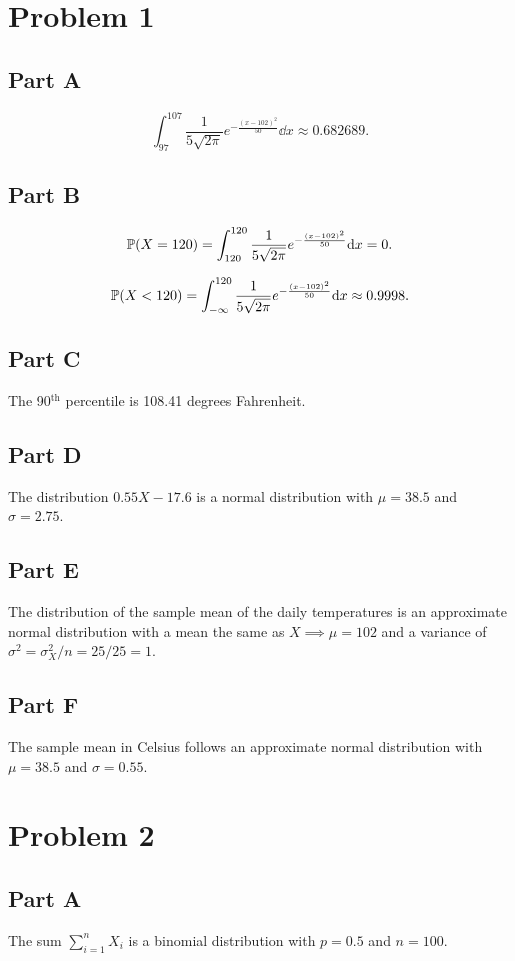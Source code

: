 \documentclass[12pt]{extarticle}
\begin{document}
\section*{Problem 1}
\subsection*{Part A}
\[
	\int_{97}^{107} \frac{1}{5 \sqrt{2\pi}} e^{-\frac{(x-102)^2}{50}} \dd x \approx 0.682689
.\]

\subsection*{Part B}
\[
	\mathbb{P}\qty(X = 120) = \int_{120}^{120} \frac{1}{5 \sqrt{2\pi}} e^{-\frac{(x-102)^2}{50}} \dd x = 0
.\]

\[
	\mathbb{P}\qty(X < 120) = \int_{-\infty}^{120} \frac{1}{5 \sqrt{2\pi}} e^{-\frac{(x-102)^2}{50}} \dd x \approx 0.9998
.\]

\subsection*{Part C}
The 90$^{\text{th}}$ percentile is 108.41 degrees Fahrenheit.

\subsection*{Part D}
The distribution $0.55 X - 17.6$ is a normal distribution with $\mu = 38.5$ and $\sigma = 2.75$.

\subsection*{Part E}
The distribution of the sample mean of the daily temperatures is an approximate normal distribution with a mean the same as $X \implies \mu = 102$ and a variance of $\sigma^2 = \sigma_X^2 / n = 25/25 = 1$.

\subsection*{Part F}
The sample mean in Celsius follows an approximate normal distribution with $\mu = 38.5$ and $\sigma = 0.55$.

\section*{Problem 2}
\subsection*{Part A}
The sum $\sum_{i=1}^{n} X_i$ is a binomial distribution with $p = 0.5$ and $n = 100$.
\end{document}
